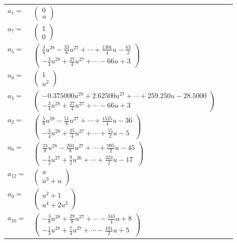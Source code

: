 \documentclass[1p]{elsarticle_modified}
\theoremstyle{definition}
\begin{document}
\begin{tabular}{m{7pt} m{180pt} m{7pt} m{180pt} }
\flushright $a_{1}=$&$\begin{pmatrix}0\\u\end{pmatrix}$ \\
\flushright $a_{7}=$&$\begin{pmatrix}1\\0\end{pmatrix}$ \\
\flushright $a_{5}=$&$\begin{pmatrix}\frac{3}{8} u^{28}-\frac{33}{8} u^{27}+\cdots+\frac{1301}{4} u-\frac{63}{2}\\-\frac{3}{4} u^{28}+\frac{27}{4} u^{27}+\cdots-66 u+3\end{pmatrix}$ \\
\flushright $a_{8}=$&$\begin{pmatrix}1\\u^2\end{pmatrix}$ \\
\flushright $a_{4}=$&$\begin{pmatrix}-0.375000 u^{28}+2.62500 u^{27}+\cdots+259.250 u-28.5000\\-\frac{3}{4} u^{28}+\frac{27}{4} u^{27}+\cdots-66 u+3\end{pmatrix}$ \\
\flushright $a_{2}=$&$\begin{pmatrix}\frac{5}{8} u^{28}-\frac{51}{8} u^{27}+\cdots+\frac{1525}{4} u-36\\-\frac{3}{4} u^{28}+\frac{25}{4} u^{27}+\cdots+\frac{55}{2} u-5\end{pmatrix}$ \\
\flushright $a_{6}=$&$\begin{pmatrix}\frac{23}{8} u^{28}-\frac{203}{8} u^{27}+\cdots+\frac{995}{2} u-45\\-\frac{1}{2} u^{27}+\frac{9}{2} u^{26}+\cdots+\frac{323}{2} u-17\end{pmatrix}$ \\
\flushright $a_{12}=$&$\begin{pmatrix}u\\u^3+u\end{pmatrix}$ \\
\flushright $a_{9}=$&$\begin{pmatrix}u^2+1\\u^4+2 u^2\end{pmatrix}$ \\
\flushright $a_{10}=$&$\begin{pmatrix}-\frac{3}{8} u^{28}+\frac{29}{8} u^{27}+\cdots-\frac{343}{4} u+8\\-\frac{1}{4} u^{28}+\frac{7}{4} u^{27}+\cdots-\frac{101}{2} u+5\end{pmatrix}$ \\

\end{tabular}
\end{document}
